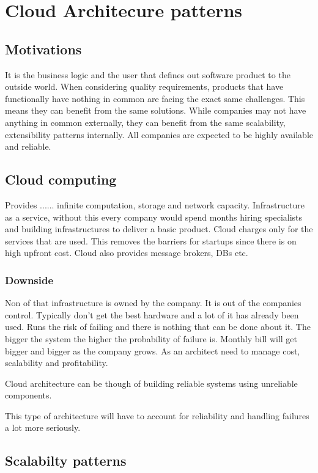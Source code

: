 \documentclass[a4paper, 11pt]{book}
\begin{document}
    \chapter{Cloud Architecure patterns}

    \section{Motivations}
    It is the business logic and the user that defines out software product to the outside world.
    When considering quality requirements, products that have functionally have nothing in common are facing the exact same challenges.
    This means they can benefit from the same solutions.
    While companies may not have anything in common externally, they can benefit from the same scalability, extensibility patterns internally.
    All companies are expected to be highly available and reliable.

    \section{Cloud computing}
    Provides ...... infinite computation, storage and network capacity.
    Infrastructure as a service, without this every company would spend months hiring specialists and building infrastructures to deliver a basic product.
    Cloud charges only for the services that are used.
    This removes the barriers for startups since there is on high upfront cost.
    Cloud also provides message brokers, DBs etc.

    \subsection{Downside}
    Non of that infrastructure is owned by the company.
    It is out of the companies control.
    Typically don't get the best hardware and a lot of it has already been used.
    Runs the risk of failing and there is nothing that can be done about it.
    The bigger the system the higher the probability of failure is.
    Monthly bill will get bigger and bigger as the company grows.
    As an architect need to manage cost, scalability and profitability.

    Cloud architecture can be though of building reliable systems using unreliable components.

    This type of architecture will have to account for reliability and handling failures a lot more seriously.

    \section{Scalabilty patterns}
\end{document}
